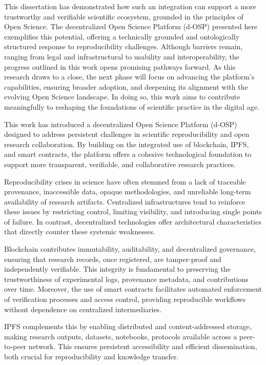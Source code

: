 \documentclass[final]{rc-book-2.14}
\begin{document}
This dissertation has demonstrated how such an integration can support a more trustworthy and verifiable scientific ecosystem, grounded in the principles of Open Science. The decentralized Open Science Platform (d-OSP) presented here exemplifies this potential, offering a technically grounded and ontologically structured response to reproducibility challenges. Although barriers remain, ranging from legal and infrastructural to usability and interoperability, the progress outlined in this work opens promising pathways forward. As this research draws to a close, the next phase will focus on advancing the platform's capabilities, ensuring broader adoption, and deepening its alignment with the evolving Open Science landscape. In doing so, this work aims to contribute meaningfully to reshaping the foundations of scientific practice in the digital age.

This work has introduced a decentralized Open Science Platform (d-OSP) designed to address persistent challenges in scientific reproducibility and open research collaboration. By building on the integrated use of blockchain, IPFS, and smart contracts, the platform offers a cohesive technological foundation to support more transparent, verifiable, and collaborative research practices.

Reproducibility crises in science have often stemmed from a lack of traceable provenance, inaccessible data, opaque methodologies, and unreliable long-term availability of research artifacts. Centralized infrastructures tend to reinforce these issues by restricting control, limiting visibility, and introducing single points of failure. In contrast, decentralized technologies offer architectural characteristics that directly counter these systemic weaknesses.

Blockchain contributes immutability, auditability, and decentralized governance, ensuring that research records, once registered, are tamper-proof and independently verifiable. This integrity is fundamental to preserving the trustworthiness of experimental logs, provenance metadata, and contributions over time. Moreover, the use of smart contracts facilitates automated enforcement of verification processes and access control, providing reproducible workflows without dependence on centralized intermediaries.

IPFS complements this by enabling distributed and content-addressed storage, making research outputs, datasets, notebooks, protocols available across a peer-to-peer network. This ensures persistent accessibility and efficient dissemination, both crucial for reproducibility and knowledge transfer.
\end{document}
